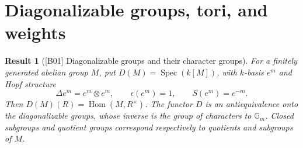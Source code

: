 \documentclass[11pt,a4paper,openany,oneside]{book}
\theoremstyle{resultstyle}
\newtheorem{statement}{Result}[chapter]
\newenvironment{result}[2]{\clubpenalty=10000\begin{statement}[\textnormal{[#1]} #2]\leavevmode\label{res:#1}\ignorespaces}{\end{statement}}
\theoremstyle{definition}
\numberwithin{equation}{chapter}
\begin{document}
\section{Diagonalizable groups, tori, and weights}

\begin{result}{B01}{Diagonalizable groups and their character groups}
For a finitely generated abelian group \(M\), put
\(D(M)=\operatorname{Spec}(k[M])\), with \(k\)-basis \(e^m\) and
Hopf structure
\[
 \Delta e^m=e^m\otimes e^m,\qquad \epsilon(e^m)=1,\qquad S(e^m)=e^{-m}.
\]
Then \(D(M)(R)=\operatorname{Hom}(M,R^\times)\). The functor \(D\)
is an antiequivalence onto the diagonalizable groups, whose inverse
is the group of characters to \(\mathbb G_m\). Closed subgroups and
quotient groups correspond respectively to quotients and subgroups of \(M\).
\end{result}
\end{document}
